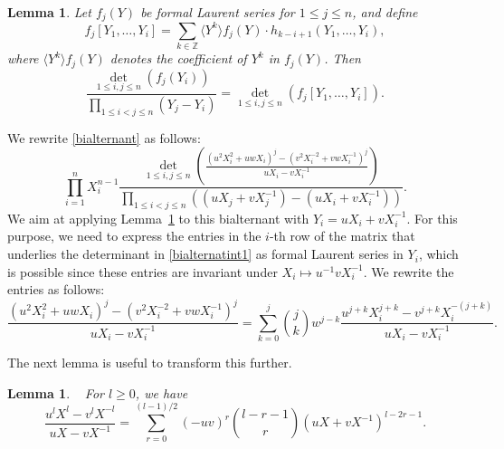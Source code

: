 \documentclass[12pt]{amsart}
\newtheorem{lemma}[theorem]{Lemma}
\theoremstyle{definition}
\numberwithin{equation}{section}
\begin{document}
\begin{lemma}
\label{lem:det} 
Let $f_j(Y)$ be formal Laurent series for $1 \le j \le n$, and define 
\begin{equation*}
f_j[Y_1,\ldots,Y_i]=\sum_{k \in \mathbb{Z}} \langle Y^{k} \rangle f_j(Y) \cdot h_{k-i+1}(Y_1,\ldots,Y_i),
\end{equation*}
where $\langle Y^{k} \rangle f_j(Y)$ denotes the coefficient of $Y^{k}$ in $f_j(Y)$.
Then 
\begin{equation*}
\frac{\det_{1 \le i, j \le n} \left( f_j(Y_i) \right) }{\prod_{1 \le i < j \le n} (Y_j - Y_i)} = \det_{1 \le i, j \le n} \left( f_j[Y_1,\ldots,Y_i] \right).
\end{equation*}
\end{lemma}

We rewrite \eqref{bialternant} as follows:
\begin{equation}
\label{bialternatint1} 
\prod_{i=1}^{n} X_i^{n-1}  
\frac{\det\limits_{1 \le i,j \le n} \left( \frac{\left(u^2 X_i^2 + u w X_i\right)^j - \left(v^2 X_i^{-2} + v w X_i^{-1}\right)^j}{u X_i - v X_i^{-1}} \right)}{\prod\limits_{1 \le i < j \le n} \left( (u X_j + v X_j^{-1}) - (u X_i + v X_i^{-1})\right)}.
\end{equation} 
We aim at applying Lemma~\ref{lem:det} to this bialternant with $Y_i=u X_i + v X_i^{-1}$. For this purpose, we need to express the entries in the $i$-th row of the matrix that underlies the determinant in \eqref{bialternatint1} as formal Laurent series in $Y_i$, which is possible since these entries are invariant under $X_i \mapsto  u^{-1} v X_i^{-1}$. We rewrite the entries as follows:
\begin{equation}
\label{entry}
\frac{\left(u^2 X_i^2 + u w X_i\right)^j - \left(v^2 X_i^{-2} + v w X_i^{-1}\right)^j}{u X_i - v X_i^{-1}} =  
\sum_{k=0}^j \binom{j}{k} w^{j-k} 
\frac{u^{j+k} X_i^{j+k} - v^{j+k} X_i^{-(j+k)}}{u X_i - v X_i^{-1}}.
\end{equation} 


The next lemma is useful to transform this further.

\begin{lemma} 
\label{basis} 
For $l \ge 0$, we have 
\begin{equation*}
\frac{u^{l} X^{l} - v^{l} X^{-l}}{u X - v X^{-1}} = \sum_{r=0}^{(l-1)/2} (-uv)^r \binom{l-r-1}{r} (u X + v X^{-1})^{l-2r-1}.
\end{equation*}
\end{lemma}
\end{document}
